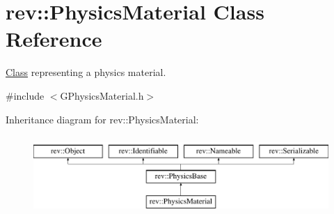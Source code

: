 \hypertarget{classrev_1_1_physics_material}{}\section{rev\+::Physics\+Material Class Reference}
\label{classrev_1_1_physics_material}


\mbox{\hyperlink{struct_class}{Class}} representing a physics material.  




{\ttfamily \#include $<$G\+Physics\+Material.\+h$>$}

Inheritance diagram for rev\+::Physics\+Material\+:\begin{figure}[H]
\begin{center}
\leavevmode
\includegraphics[height=3.000000cm]{classrev_1_1_physics_material}
\end{center}
\end{figure}
